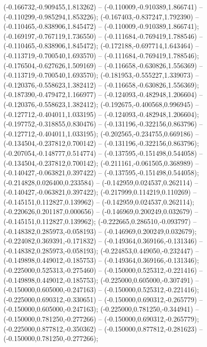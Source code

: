  (-0.166732,-0.909455,1.813262) -- (-0.110009,-0.910389,1.866741) -- (-0.110299,-0.985294,1.853226);
 (-0.167403,-0.837247,1.792390) -- (-0.110465,-0.838906,1.845472) -- (-0.110009,-0.910389,1.866741);
 (-0.169197,-0.767119,1.736550) -- (-0.111684,-0.769419,1.788546) -- (-0.110465,-0.838906,1.845472);
 (-0.172188,-0.697714,1.643464) -- (-0.113719,-0.700540,1.693570) -- (-0.111684,-0.769419,1.788546);
 (-0.176504,-0.627626,1.509169) -- (-0.116658,-0.630826,1.556369) -- (-0.113719,-0.700540,1.693570);
 (-0.181953,-0.555227,1.339073) -- (-0.120376,-0.558623,1.382412) -- (-0.116658,-0.630826,1.556369);
 (-0.187390,-0.479472,1.166977) -- (-0.124093,-0.482948,1.206604) -- (-0.120376,-0.558623,1.382412);
 (-0.192675,-0.400568,0.996945) -- (-0.127712,-0.404011,1.033195) -- (-0.124093,-0.482948,1.206604);
 (-0.197752,-0.318855,0.830476) -- (-0.131196,-0.322156,0.863796) -- (-0.127712,-0.404011,1.033195);
 (-0.202565,-0.234755,0.669186) -- (-0.134504,-0.237812,0.700142) -- (-0.131196,-0.322156,0.863796);
 (-0.207054,-0.148777,0.514774) -- (-0.137595,-0.151498,0.544058) -- (-0.134504,-0.237812,0.700142);
 (-0.211161,-0.061505,0.368989) -- (-0.140427,-0.063821,0.397422) -- (-0.137595,-0.151498,0.544058);
 (-0.214828,0.026400,0.233584) -- (-0.142959,0.024537,0.262114) -- (-0.140427,-0.063821,0.397422);
 (-0.217999,0.114219,0.110269) -- (-0.145151,0.112827,0.139962) -- (-0.142959,0.024537,0.262114);
 (-0.220626,0.201187,0.000656) -- (-0.146969,0.200249,0.032679) -- (-0.145151,0.112827,0.139962);
 (-0.222665,0.286510,-0.093797) -- (-0.148382,0.285973,-0.058193) -- (-0.146969,0.200249,0.032679);
 (-0.224082,0.369391,-0.171832) -- (-0.149364,0.369166,-0.131346) -- (-0.148382,0.285973,-0.058193);
 (-0.224853,0.449050,-0.232447) -- (-0.149898,0.449012,-0.185753) -- (-0.149364,0.369166,-0.131346);
 (-0.225000,0.525313,-0.275460) -- (-0.150000,0.525312,-0.221416) -- (-0.149898,0.449012,-0.185753);
 (-0.225000,0.605000,-0.307491) -- (-0.150000,0.605000,-0.247163) -- (-0.150000,0.525312,-0.221416);
 (-0.225000,0.690312,-0.330651) -- (-0.150000,0.690312,-0.265779) -- (-0.150000,0.605000,-0.247163);
 (-0.225000,0.781250,-0.344941) -- (-0.150000,0.781250,-0.277266) -- (-0.150000,0.690312,-0.265779);
 (-0.225000,0.877812,-0.350362) -- (-0.150000,0.877812,-0.281623) -- (-0.150000,0.781250,-0.277266);
